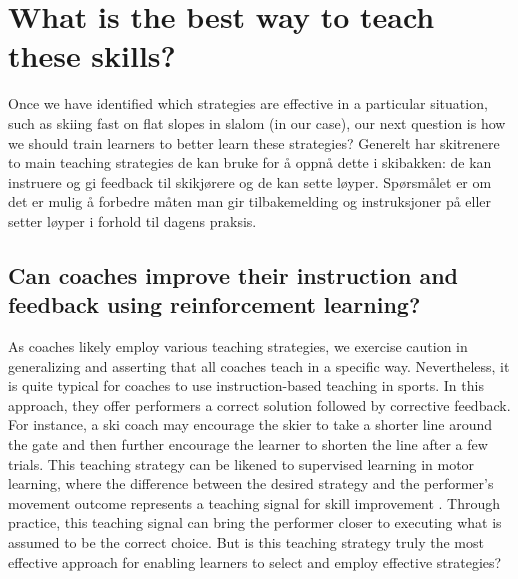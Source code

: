 \section{What is the best way to teach these skills?}
Once we have identified which strategies are effective in a particular situation, such as skiing fast on flat slopes in slalom (in our case), our next question is how we should train learners to better learn these strategies? Generelt har skitrenere to main teaching strategies de kan bruke for å oppnå dette i skibakken: de kan instruere og gi feedback til skikjørere og de kan sette løyper. Spørsmålet er om det er mulig å forbedre måten man gir tilbakemelding og instruksjoner på eller setter løyper i forhold til dagens praksis.

\subsection{Can coaches improve their instruction and feedback using reinforcement learning? }
As coaches likely employ various teaching strategies, we exercise caution in generalizing and asserting that all coaches teach in a specific way. Nevertheless, it is quite typical for coaches to use instruction-based teaching in sports\cite{williams_practice_2005, williams_effective_2023, hodges_modelling_2002}. In this approach, they offer performers a correct solution followed by corrective feedback. For instance, a ski coach may encourage the skier to take a shorter line around the gate and then further encourage the learner to shorten the line after a few trials. This teaching strategy can be likened to supervised learning in motor learning, where the difference between the desired strategy and the performer's movement outcome represents a teaching signal for skill improvement  \cite{jordan_forward_1992, wolpert_motor_2010, doya_complementary_2000}. Through practice, this teaching signal can bring the performer closer to executing what is assumed to be the correct choice. But is this teaching strategy truly the most effective approach for enabling learners to select and employ effective strategies? 

